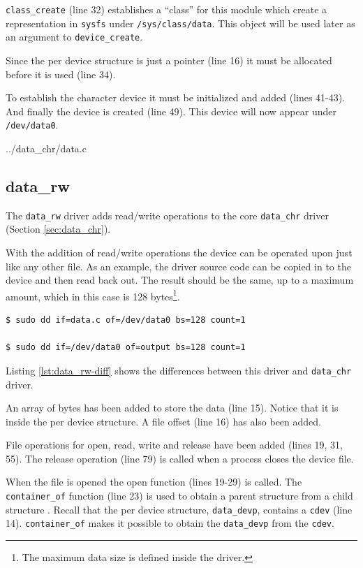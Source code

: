 \documentclass{article}
\begin{document}
\verb+class_create+ (line 32) establishes a ``class'' for this
module which create a representation in \verb+sysfs+
under \verb+/sys/class/data+.
This object will be used later as an argument to \verb+device_create+.

Since the per device structure is just a pointer (line 16) it must be
allocated before it is used (line 34).

To establish the character device it must be initialized and
added (lines 41-43).  And finally the device is created (line 49).
This device will now appear under \verb+/dev/data0+.

\pagebreak

	{../data_chr/data.c}


\clearpage
\subsection{data\_rw}
\label{sec:data_rw}

The \verb+data_rw+ driver adds read/write operations to the core
\verb+data_chr+ driver (Section \ref{sec:data_chr}).

With the addition of read/write operations the device can be
operated upon just like any other file.
As an example, the driver source code can be copied in to the
device and then read back out.
The result should be the same, up to a maximum amount, which
in this case is 128 bytes\footnote{The maximum data size is defined
inside the driver.}.

\begin{verbatim}
$ sudo dd if=data.c of=/dev/data0 bs=128 count=1

$ sudo dd if=/dev/data0 of=output bs=128 count=1
\end{verbatim}

Listing \ref{lst:data_rw-diff} shows the differences between this driver
and \verb+data_chr+ driver.

An array of bytes has been added to store the data (line 15).
Notice that it is inside the per device structure.
A file offset (line 16) has also been added.

File operations for open, read, write and release have been
added (lines 19, 31, 55).
The release operation (line 79) is called when a process closes
the device file.

When the file is opened the open function (lines 19-29) is called.
The \verb+container_of+ function (line 23) is used to obtain a parent
structure from a child structure\autocite[Pg. 79]{corbet2009linux}
\autocite{kroah2005cont}.
Recall that the per device structure, \verb+data_devp+, contains a
\verb+cdev+ (line 14).
\verb+container_of+ makes it possible to obtain the \verb+data_devp+
from the \verb+cdev+.
\end{document}
